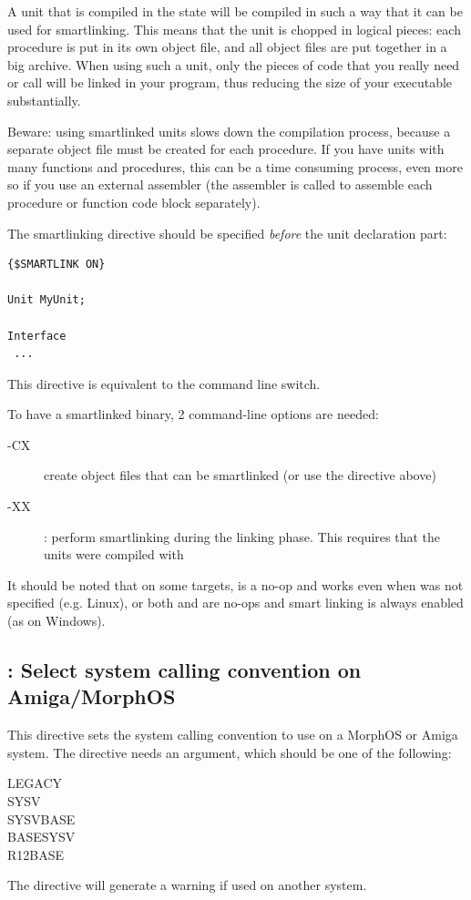 A unit that is compiled in the  state will be
compiled in such a way that it can be used for smartlinking. This means that
the unit is chopped in logical pieces: each procedure is put in its own
object file, and all object files are put together in a big archive. When
using such a unit, only the pieces of code that you really need or call
will be linked in your program, thus reducing the size of your executable
substantially.

Beware: using smartlinked units slows down the compilation process, because
a separate object file must be created for each procedure. If you have units
with many functions and procedures, this can be a time consuming process,
even more so if you use an external assembler (the assembler is called to
assemble each procedure or function code block separately).

The smartlinking directive should be specified {\em before} the unit
declaration part:
\begin{verbatim}
{$SMARTLINK ON}

Unit MyUnit;

Interface
 ...
\end{verbatim}

This directive is equivalent to the  command line switch.

To have a smartlinked binary, 2 command-line options are needed:
\begin{description}
\item[-CX] create object files that can be smartlinked (or use the directive above)
\item[-XX]: perform smartlinking during the linking phase. This requires that
the units were compiled with 
\end{description}

It should be noted that on some targets,  is a no-op and  
works even when  was not specified (e.g. Linux), or both  and  
are no-ops and smart linking is always enabled (as on Windows).

\subsection{ : Select system calling convention on Amiga/MorphOS}
This directive sets the system calling convention to use on a MorphOS or
Amiga system. The directive needs an argument, which should be one of the
following:
\begin{description}
\item[LEGACY]
\item[SYSV]
\item[SYSVBASE]
\item[BASESYSV]
\item[R12BASE]
\end{description}
The directive will generate a warning if used on another system.

